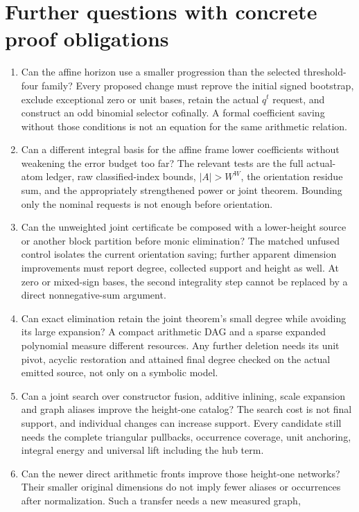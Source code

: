 \section{Further questions with concrete proof obligations}
\begin{enumerate}
\item Can the affine horizon use a smaller progression than the selected
threshold-four family? Every proposed change must reprove the initial
signed bootstrap, exclude exceptional zero or unit bases, retain the actual
$q^t$ request, and construct an odd binomial selector cofinally. A formal
coefficient saving without those conditions is not an equation for the
same arithmetic relation.
\item Can a different integral basis for the affine frame lower coefficients
without weakening the error budget too far? The relevant tests are the full
actual-atom ledger, raw classified-index bounds, $|A|>W^W$, the orientation
residue sum, and the appropriately strengthened power or joint theorem.
Bounding only the nominal requests is not enough before orientation.
\item Can the unweighted joint certificate be composed with a lower-height
source or another block partition before monic elimination? The matched
unfused control isolates the current orientation saving; further apparent
dimension improvements must report degree, collected support and height as
well. At zero or mixed-sign bases, the second integrality step cannot be
replaced by a direct nonnegative-sum argument.
\item Can exact elimination retain the joint theorem's small degree while
avoiding its large expansion? A compact arithmetic DAG and a sparse expanded
polynomial measure different resources. Any further deletion needs its unit
pivot, acyclic restoration and attained final degree checked on the actual
emitted source, not only on a symbolic model.
\item Can a joint search over constructor fusion, additive inlining, scale
expansion and graph aliases improve the height-one catalog? The search cost
is not final support, and individual changes can increase support. Every
candidate still needs the complete triangular pullbacks, occurrence coverage,
unit anchoring, integral energy and universal lift including the hub term.
\item Can the newer direct arithmetic fronts improve those height-one
networks? Their smaller original dimensions do not imply fewer aliases or
occurrences after normalization. Such a transfer needs a new measured graph,

\end{enumerate}
